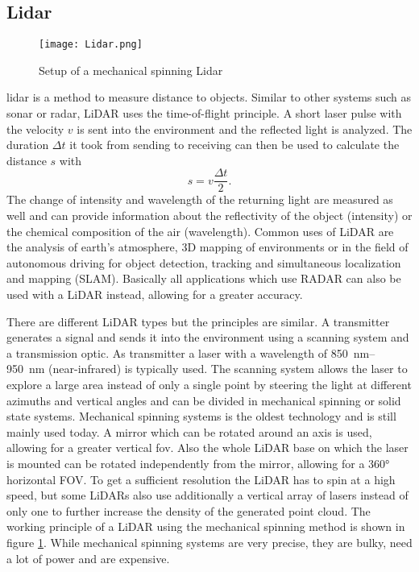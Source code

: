 \subsection{Lidar}
\begin{figure}[htb]
	\centering
	\texttt{[image: Lidar.png]}
	\caption{Setup of a mechanical spinning Lidar \cite{Li2020}}
	\label{fig:lidar}
\end{figure}
\gls{lidar} is a method to measure distance to objects.
Similar to other systems such as \gls{sonar} or \gls{radar}, LiDAR uses the time-of-flight principle.
A short laser pulse with the velocity $v$ is sent into the environment and the reflected light is analyzed.
The duration $\Delta t$ it took from sending to receiving can then be used to calculate the distance $s$ with 
\[ s = v\frac{\Delta t}{2}. \]
The change of intensity and wavelength of the returning light are measured as well and can provide information about the reflectivity of the object (intensity) or the chemical composition of the air (wavelength).
Common uses of LiDAR are the analysis of earth's atmosphere, 3D mapping of environments or in the field of autonomous driving for object detection, tracking and simultaneous localization and mapping (SLAM).
Basically all applications which use RADAR can also be used with a LiDAR instead, allowing for a greater accuracy.

There are different LiDAR types but the principles are similar.
A transmitter generates a signal and sends it into the environment using a scanning system and a transmission optic.
As transmitter a laser with a wavelength of \SIrange{850}{950}{\nano\metre} (near-infrared) is typically used.
The scanning system allows the laser to explore a large area instead of only a single point by steering the light at different azimuths and vertical angles and can be divided in mechanical spinning or solid state systems.
Mechanical spinning systems is the oldest technology and is still mainly used today.
A mirror which can be rotated around an axis is used, allowing for a greater vertical \gls{fov}.
Also the whole LiDAR base on which the laser is mounted can be rotated independently from the mirror, allowing for a 360° horizontal FOV.
To get a sufficient resolution the LiDAR has to spin at a high speed, but some LiDARs also use additionally a vertical array of lasers instead of only one to further increase the density of the generated point cloud.
The working principle of a LiDAR using the mechanical spinning method is shown in figure \ref{fig:lidar}.
While mechanical spinning systems are very precise, they are bulky, need a lot of power and are expensive.

